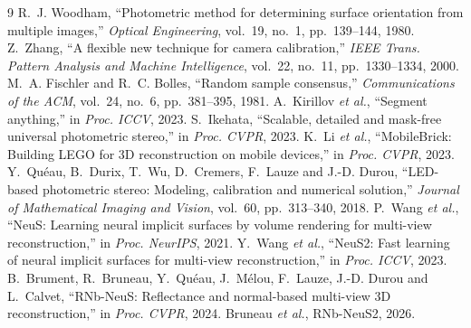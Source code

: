\documentclass[10pt,twocolumn]{article}
\begin{document}
\begin{thebibliography}{9}
 R.~J. Woodham, ``Photometric method for determining surface orientation from multiple images,'' \emph{Optical Engineering}, vol.~19, no.~1, pp.~139--144, 1980.
 Z.~Zhang, ``A flexible new technique for camera calibration,'' \emph{IEEE Trans. Pattern Analysis and Machine Intelligence}, vol.~22, no.~11, pp.~1330--1334, 2000.
 M.~A. Fischler and R.~C. Bolles, ``Random sample consensus,'' \emph{Communications of the ACM}, vol.~24, no.~6, pp.~381--395, 1981.
 A.~Kirillov \emph{et al.}, ``Segment anything,'' in \emph{Proc. ICCV}, 2023.
 S.~Ikehata, ``Scalable, detailed and mask-free universal photometric stereo,'' in \emph{Proc. CVPR}, 2023.
 K.~Li \emph{et al.}, ``MobileBrick: Building LEGO for 3D reconstruction on mobile devices,'' in \emph{Proc. CVPR}, 2023.
 Y.~Qu\'eau, B.~Durix, T.~Wu, D.~Cremers, F.~Lauze and J.-D. Durou, ``LED-based photometric stereo: Modeling, calibration and numerical solution,'' \emph{Journal of Mathematical Imaging and Vision}, vol.~60, pp.~313--340, 2018.
 P.~Wang \emph{et al.}, ``NeuS: Learning neural implicit surfaces by volume rendering for multi-view reconstruction,'' in \emph{Proc. NeurIPS}, 2021.
 Y.~Wang \emph{et al.}, ``NeuS2: Fast learning of neural implicit surfaces for multi-view reconstruction,'' in \emph{Proc. ICCV}, 2023.
 B.~Brument, R.~Bruneau, Y.~Qu\'eau, J.~M\'elou, F.~Lauze, J.-D. Durou and L.~Calvet, ``RNb-NeuS: Reflectance and normal-based multi-view 3D reconstruction,'' in \emph{Proc. CVPR}, 2024.
 Bruneau \emph{et al.}, RNb-NeuS2, 2026.
\end{thebibliography}
\end{document}
